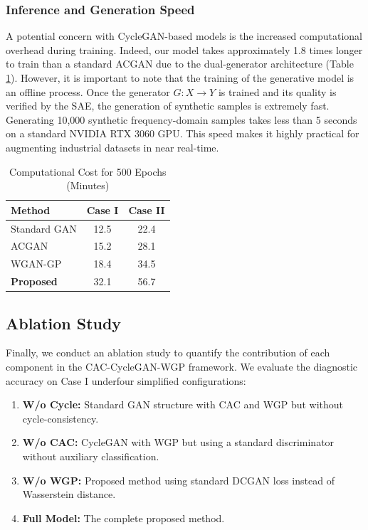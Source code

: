 \subsubsection{Inference and Generation Speed}
A potential concern with CycleGAN-based models is the increased computational overhead during training. Indeed, our model takes approximately 1.8 times longer to train than a standard ACGAN due to the dual-generator architecture (Table \ref{tab:comp_cost}). However, it is important to note that the training of the generative model is an offline process. Once the generator $G: X \to Y$ is trained and its quality is verified by the SAE, the generation of synthetic samples is extremely fast. Generating 10,000 synthetic frequency-domain samples takes less than 5 seconds on a standard NVIDIA RTX 3060 GPU. This speed makes it highly practical for augmenting industrial datasets in near real-time.

\begin{table}[htbp]
\centering
\caption{Computational Cost for 500 Epochs (Minutes)}
\label{tab:comp_cost}
\begin{tabular}{lcc}
\hline
\textbf{Method} & \textbf{Case I} & \textbf{Case II} \\ \hline
Standard GAN & 12.5 & 22.4 \\
ACGAN & 15.2 & 28.1 \\
WGAN-GP & 18.4 & 34.5 \\
\textbf{Proposed} & 32.1 & 56.7 \\
\hline
\end{tabular}
\end{table}

\subsection{Ablation Study}
Finally, we conduct an ablation study to quantify the contribution of each component in the CAC-CycleGAN-WGP framework. We evaluate the diagnostic accuracy on Case I underfour simplified configurations:
\begin{enumerate}
    \item \textbf{W/o Cycle:} Standard GAN structure with CAC and WGP but without cycle-consistency.
    \item \textbf{W/o CAC:} CycleGAN with WGP but using a standard discriminator without auxiliary classification.
    \item \textbf{W/o WGP:} Proposed method using standard DCGAN loss instead of Wasserstein distance.
    \item \textbf{Full Model:} The complete proposed method.
\end{enumerate}

